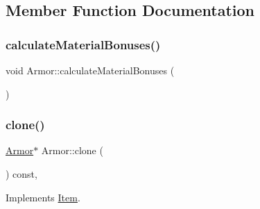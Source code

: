 \subsection{Member Function Documentation}
\mbox{\label{class_armor_ac86ccbc735cc83849f1c62099285a0c9}} 
\subsubsection{\texorpdfstring{calculate\+Material\+Bonuses()}{calculateMaterialBonuses()}}
{\footnotesize\ttfamily void Armor\+::calculate\+Material\+Bonuses (\begin{DoxyParamCaption}{ }\end{DoxyParamCaption})}

\mbox{\label{class_armor_aac8aec108de9a8a45bada1534c0f23b7}} 
\subsubsection{\texorpdfstring{clone()}{clone()}}
{\footnotesize\ttfamily \mbox{\hyperlink{class_armor}{Armor}}$\ast$ Armor\+::clone (\begin{DoxyParamCaption}{ }\end{DoxyParamCaption}) const\hspace{0.3cm}{\ttfamily [inline]}, {\ttfamily [virtual]}}



Implements \mbox{\hyperlink{class_item_a6d963581e2caad2e08979683a827f39f}{Item}}.

